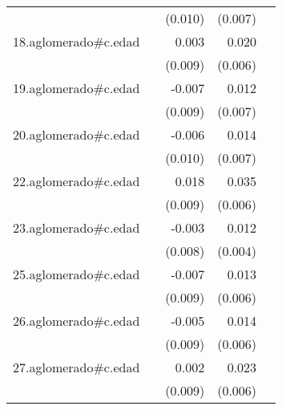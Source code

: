 {\begin{longtable}{l*{4}{D{.}{.}{-1}}}
            &                     &     (0.010)         &     (0.007)         &                     \\
\addlinespace
18.aglomerado#c.edad&                     &       0.003         &       0.020\sym{**} &                     \\
            &                     &     (0.009)         &     (0.006)         &                     \\
\addlinespace
19.aglomerado#c.edad&                     &      -0.007         &       0.012         &                     \\
            &                     &     (0.009)         &     (0.007)         &                     \\
\addlinespace
20.aglomerado#c.edad&                     &      -0.006         &       0.014         &                     \\
            &                     &     (0.010)         &     (0.007)         &                     \\
\addlinespace
22.aglomerado#c.edad&                     &       0.018\sym{*}  &       0.035\sym{***}&                     \\
            &                     &     (0.009)         &     (0.006)         &                     \\
\addlinespace
23.aglomerado#c.edad&                     &      -0.003         &       0.012\sym{**} &                     \\
            &                     &     (0.008)         &     (0.004)         &                     \\
\addlinespace
25.aglomerado#c.edad&                     &      -0.007         &       0.013\sym{*}  &                     \\
            &                     &     (0.009)         &     (0.006)         &                     \\
\addlinespace
26.aglomerado#c.edad&                     &      -0.005         &       0.014\sym{*}  &                     \\
            &                     &     (0.009)         &     (0.006)         &                     \\
\addlinespace
27.aglomerado#c.edad&                     &       0.002         &       0.023\sym{***}&                     \\
            &                     &     (0.009)         &     (0.006)         &                     \\

\end{longtable}}
